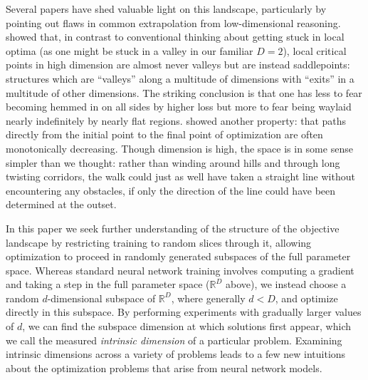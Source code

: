 \documentclass{article} %
\begin{document}
Several papers have shed valuable light on this landscape, particularly by pointing out flaws in common extrapolation from low-dimensional reasoning.
\cite{dauphin2014identifying-and-attacking-the-saddle} showed that, in contrast to conventional thinking about getting stuck in local optima (as one might be stuck in a valley in our familiar $D=2$), local critical points in high dimension are almost never valleys but are instead saddlepoints: structures which are ``valleys'' along a multitude of dimensions with ``exits'' in a multitude of other dimensions. The striking conclusion is that one has less to fear becoming hemmed in on all sides by higher loss but more to fear being waylaid nearly indefinitely by nearly flat regions.
\cite{goodfellow-2015-ICLR-qualitatively-characterizing-neural} showed another property: that paths directly from the initial point to the final point of optimization are often monotonically decreasing. Though dimension is high, the space is in some sense simpler than we thought: rather than winding around hills and through long twisting corridors, the walk could just as well have taken a straight line without encountering any obstacles, if only the direction of the line could have been determined at the outset.

In this paper we seek further understanding of the structure of the
objective landscape by restricting training to random slices through
it, allowing optimization to proceed in randomly generated subspaces
of the full parameter space.
Whereas
standard neural network training involves computing a gradient and
taking a step in the full parameter space ($\mathbb{R}^D$ above), we
instead choose a random $d$-dimensional subspace of $\mathbb{R}^D$,
where generally $d < D$, and optimize directly in this subspace. By
performing experiments with gradually larger values of $d$, we can
find the subspace dimension at which solutions first appear, which we call the
measured \emph{intrinsic dimension} of a particular problem. Examining
intrinsic dimensions across a variety of problems leads to a few new
intuitions about the optimization problems that arise from neural network
models.
\end{document}

